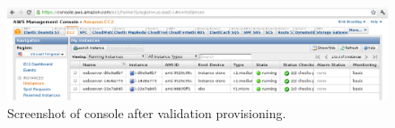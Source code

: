 \begin{figure}[tb]
  \includegraphics[width=\linewidth]{imgs/aws-console.png}
  \caption{Screenshot of  console after validation provisioning.}
  \label{fig:validation-aws}
\end{figure}
